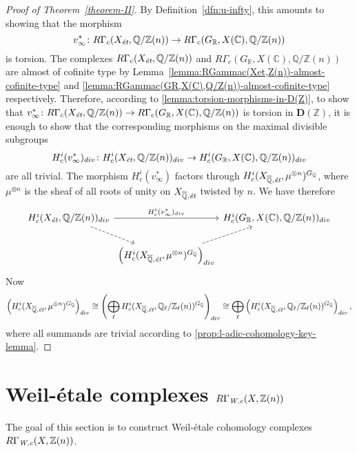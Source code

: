 \documentclass{article}
\newcommand{\CC}{\mathbb{C}}
\newcommand{\QQ}{\mathbb{Q}}
\newcommand{\RR}{\mathbb{R}}
\newcommand{\ZZ}{\mathbb{Z}}
\newcommand{\et}{\text{\it ét}}
\newcommand{\Wc}{\text{\it W,c}}
\theoremstyle{definition}
\numberwithin{equation}{section}
\begin{document}
\begin{proof}[Proof of Theorem~\ref{theorem-II}]
  By Definition~\ref{dfn:u-infty}, this amounts to showing that the morphism
  $$v_\infty^*\colon R\Gamma_c (X_\et, \QQ/\ZZ (n)) \to R\Gamma_c (G_\RR, X (\CC), \QQ/\ZZ (n))$$
  is torsion. The complexes $R\Gamma_c (X_\et, \QQ/\ZZ (n))$ and
  $R\Gamma_c (G_\RR, X (\CC), \QQ/\ZZ (n))$ are almost of cofinite type by
  Lemma~\ref{lemma:RGammac(Xet,Z(n))-almost-cofinite-type} and
  \ref{lemma:RGammac(GR,X(C),Q/Z(n))-almost-cofinite-type} respectively.
  Therefore, according to \ref{lemma:torsion-morphisms-in-D(Z)}, to show that
  $v^*_\infty\colon R\Gamma_c (X_\et, \QQ/\ZZ (n)) \to R\Gamma_c (G_\RR, X
  (\CC), \QQ/\ZZ (n))$ is torsion in $\mathbf{D} (\ZZ)$, it is enough to show
  that the corresponding morphisms on the maximal divisible subgroups
  \[ H^i_c (v^*_\infty)_{div}\colon H^i_c (X_\et, \QQ/\ZZ (n))_{div} \to
     H^i_c (G_\RR, X (\CC), \QQ/\ZZ (n))_{div} \]
  are all trivial. The morphism $H^i_c (v^*_\infty)$ factors through
  $H^i_c (X_{\overline{\QQ}, \text{\it ét}}, \mu^{\otimes n})^{G_\QQ}$, where
  $\mu^{\otimes n}$ is the sheaf of all roots of unity on
  $X_{\overline{\QQ}, \text{\it ét}}$ twisted by $n$.
  We have therefore
  \[ \begin{tikzcd}[column sep=0pt]
    H^i_c (X_\et, \QQ/\ZZ (n))_{div}\ar{rr}{H^i_c (v^*_\infty)_{div}}\ar[dashed]{dr} && H^i_c (G_\RR, X (\CC), \QQ/\ZZ (n))_{div}\\
    & \left(H^i_c (X_{\overline{\QQ}, \text{\it ét}}, \mu^{\otimes n})^{G_\QQ}\right)_{div}\ar[dashed]{ur}
  \end{tikzcd} \]
  Now
  \[ \left(H^i_c (X_{\overline{\QQ}, \text{\it ét}}, \mu^{\otimes n})^{G_\QQ}\right)_{div} \cong
  \left(\bigoplus_\ell H^i_c (X_{\overline{\QQ}, \text{\it ét}}, \QQ_\ell/\ZZ_\ell (n))^{G_\QQ}\right)_{div} \cong
  \bigoplus_\ell \left(H^i_c (X_{\overline{\QQ}, \text{\it ét}}, \QQ_\ell/\ZZ_\ell (n))^{G_\QQ}\right)_{div}, \]
  where all summands are trivial according to
  \ref{prop:l-adic-cohomology-key-lemma}.
\end{proof}


\section{Weil-étale complexes $R\Gamma_\Wc (X, \ZZ(n))$}
\label{sec:RGamma-Wc}

The goal of this section is to construct Weil-étale cohomology complexes
$R\Gamma_\Wc (X, \ZZ(n))$.
\end{document}
